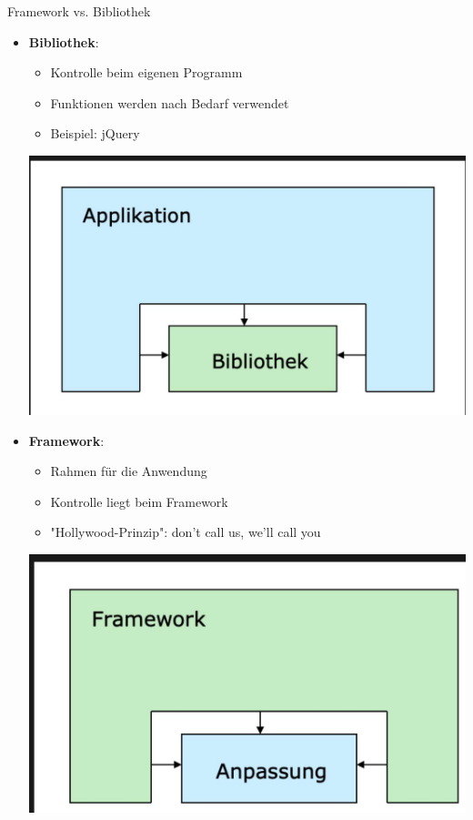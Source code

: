 \begin{definition}{Framework vs. Bibliothek}
    \begin{itemize}
        \item \textbf{Bibliothek}: 
            \begin{itemize}
                \item Kontrolle beim eigenen Programm
                \item Funktionen werden nach Bedarf verwendet
                \item Beispiel: jQuery
            \end{itemize}
            \includegraphics[width=\linewidth]{images/2025_01_02_22162ee5453ad0230328g-04}
        \item \textbf{Framework}: 
            \begin{itemize}
                \item Rahmen für die Anwendung
                \item Kontrolle liegt beim Framework
                \item "Hollywood-Prinzip": don't call us, we'll call you
            \end{itemize}
            \includegraphics[width=\linewidth]{images/2025_01_02_22162ee5453ad0230328g-05}
    \end{itemize}
\end{definition}

